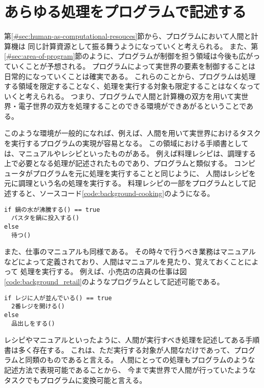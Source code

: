 \section{あらゆる処理をプログラムで記述する}\label{ux3042ux3089ux3086ux308bux51e6ux7406ux3092ux30d7ux30edux30b0ux30e9ux30e0ux3067ux8a18ux8ff0ux3059ux308b}

第\ref{#sec:human-as-computational-resouces}節から、プログラムにおいて人間と計算機は
同じ計算資源として振る舞うようになっていくと考えられる。
また、第\ref{#sec:area-of-program}節のように、プログラムが制御を担う領域は今後も広がっていくことが予想される。
プログラムによって実世界の要素を制御することは日常的になっていくことは確実である。
これらのことから、プログラムは処理する領域を限定することなく、処理を実行する対象も限定することはなくなっていくと考えられる。
つまり、プログラムで人間と計算機の双方を用いて実世界・電子世界の双方を処理することのできる環境ができあがるということである。

このような環境が一般的になれば、例えば、人間を用いて実世界におけるタスクを実行するプログラムの実現が容易となる。
この領域における手順書としては、マニュアルやレシピといったものがある。
例えば料理レシピは、調理する上で必要となる処理が記述されたものであり、プログラムと類似する。
コンピュータがプログラムを元に処理を実行することと同じように、
人間はレシピを元に調理という名の処理を実行する。
料理レシピの一部をプログラムとして記述すると、ソースコード\ref{code:background-cooking}のようになる。

\begin{lstlisting}[caption=料理レシピの一部の擬似コードで表す, label=code:background-cooking]
if 鍋の水が沸騰する() == true
  パスタを鍋に投入する()
else
  待つ()
\end{lstlisting}

また、仕事のマニュアルも同様である。
その時々で行うべき業務はマニュアルなどによって定義されており、人間はマニュアルを見たり、覚えておくことによって
処理を実行する。
例えば、小売店の店員の仕事は図\ref{code:background_retail}のようなプログラムとして記述可能である。

\begin{lstlisting}[caption=小売店の店員の挙動の一部を擬似コードで表す, label=code:background-retail]
if レジに人が並んでいる() == true
  2番レジを開ける()
else
  品出しをする()
\end{lstlisting}

レシピやマニュアルといったように、人間が実行すべき処理を記述してある手順書は多く存在する。
これは、ただ実行する対象が人間なだけであって、プログラムと同類のものであると言える。
人間にとっての処理もプログラムのような記述方法で表現可能であることから、
今まで実世界で人間が行っていたようなタスクでもプログラムに変換可能と言える。

